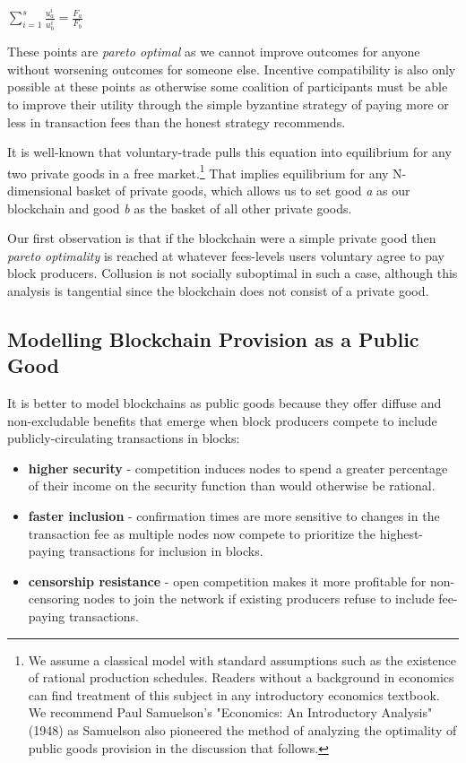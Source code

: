 \documentclass[oneside]{article}   	%
\begin{document}
\LARGE
\begin{adjustwidth}{1.5em}{1.5em} 
\begin{math}
\sum_{i=1}^{s} \frac{u_a^i}{u_b^i} = \frac{F_a}{F_b}
\end{math}
\end{adjustwidth}
\normalsize

These points are \textit{pareto optimal} as we cannot improve outcomes for anyone without worsening outcomes for someone else. Incentive compatibility is also only possible at these points as otherwise some coalition of participants must be able to improve their utility through the simple byzantine strategy of paying more or less in transaction fees than the honest strategy recommends.

It is well-known that voluntary-trade pulls this equation into equilibrium for any two private goods in a free market.\footnote{We assume a classical model with standard assumptions such as the existence of rational production schedules. Readers without a background in economics can find treatment of this subject in any introductory economics textbook. We recommend Paul Samuelson's "Economics: An Introductory Analysis" (1948) as Samuelson also pioneered the method of analyzing the optimality of public goods provision in the discussion that follows.} That implies equilibrium for any N-dimensional basket of private goods, which allows us to set good \textit{a} as our blockchain and good \textit{b} as the basket of all other private goods.

Our first observation is that if the blockchain were a simple private good then \textit{pareto optimality} is reached at whatever fees-levels users voluntary agree to pay block producers. Collusion is not socially suboptimal in such a case, although this analysis is tangential since the blockchain does not consist of a private good.

\subsection*{Modelling Blockchain Provision as a Public Good}

It is better to model blockchains as public goods because they offer diffuse and non-excludable benefits that emerge when block producers compete to include publicly-circulating transactions in blocks:

\begin{itemize}
  \item \textbf{higher security} - competition induces nodes to spend a greater percentage of their income on the security function than would otherwise be rational.
  \item \textbf{faster inclusion} - confirmation times are more sensitive to changes in the transaction fee as multiple nodes now compete to prioritize the highest-paying transactions for inclusion in blocks.
  \item \textbf{censorship resistance} - open competition makes it more profitable for non-censoring nodes to join the network if existing producers refuse to include fee-paying transactions.
\end{itemize}
\end{document}
